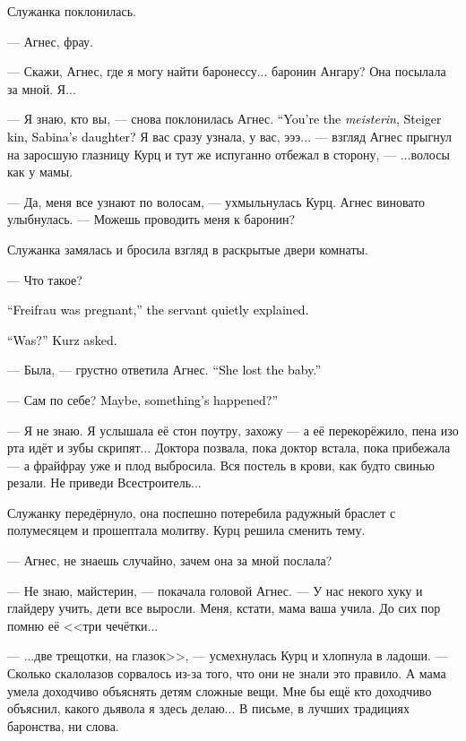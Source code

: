 \documentclass[a4paper,10pt,fleqn]{book}\usepackage{polyglossia}\setdefaultlanguage{english}\setotherlanguage{russian}\defaultfontfeatures{Ligatures=TeX,Mapping=tex-text}\usepackage{xcolor}\definecolor{lightgray}{HTML}{bbbbbb}\color{lightgray}\newcommand{\ml}[3]{\textcolor{black}{#3}}
\begin{document}
Служанка поклонилась.

--- Агнес, фрау.

--- Скажи, Агнес, где я могу найти баронессу... баронин Ангару?
Она посылала за мной.
Я...

--- Я знаю, кто вы, --- снова поклонилась Агнес.
\ml{$0$}
{--- Вы майстерин из Штайгеров, дочь Сабины?}
{``You're the \textit{meisterin}, Steiger kin, Sabina's daughter?}
Я вас сразу узнала, у вас, эээ... --- взгляд Агнес прыгнул на заросшую глазницу Курц и тут же испуганно отбежал в сторону, --- ...волосы как у мамы.

--- Да, меня все узнают по волосам, --- ухмыльнулась Курц.
Агнес виновато улыбнулась.
--- Можешь проводить меня к баронин?

Служанка замялась и бросила взгляд в раскрытые двери комнаты.

--- Что такое?

\ml{$0$}
{--- Фрайфрау была беременна, --- шёпотом пояснила служанка.}
{``Freifrau was pregnant,'' the servant quietly explained.}

\ml{$0$}
{--- Была? --- уточнила Курц.}
{``Was?'' Kurz asked.}

--- Была, --- грустно ответила Агнес.
\ml{$0$}
{--- Выкидыш.}
{``She lost the baby.''}

--- Сам по себе?
\ml{$0$}
{Может, случилось чего?}
{Maybe, something's happened?''}

--- Я не знаю.
Я услышала её стон поутру, захожу --- а её перекорёжило, пена изо рта идёт и зубы скрипят...
Доктора позвала, пока доктор встала, пока прибежала --- а фрайфрау уже и плод выбросила.
Вся постель в крови, как будто свинью резали.
Не приведи Всестроитель...

Служанку передёрнуло, она поспешно потеребила радужный браслет с полумесяцем и прошептала молитву.
Курц решила сменить тему.

--- Агнес, не знаешь случайно, зачем она за мной послала?

--- Не знаю, майстерин, --- покачала головой Агнес.
--- У нас некого хуку и глайдеру учить, дети все выросли.
Меня, кстати, мама ваша учила.
До сих пор помню её <<три чечётки...

--- ...две трещотки, на глазок>>, --- усмехнулась Курц и хлопнула в ладоши.
--- Сколько скалолазов сорвалось из-за того, что они не знали это правило.
А мама умела доходчиво объяснять детям сложные вещи.
Мне бы ещё кто доходчиво объяснил, какого дьявола я здесь делаю...
В письме, в лучших традициях баронства, ни слова.
\end{document}
